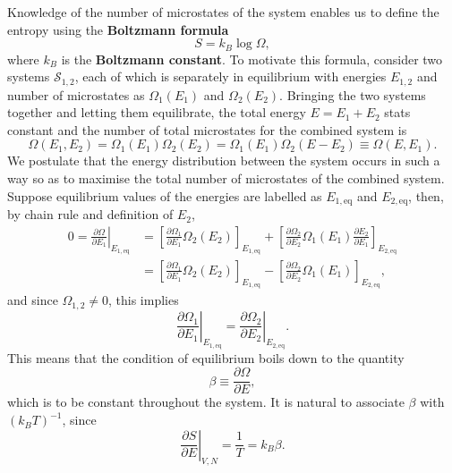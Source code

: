 \documentclass[letter-paper]{tufte-book}
\newcommand\Def[1]{\textbf{#1}}
\begin{document}
Knowledge of the number of microstates of the system enables us to define the
entropy using the \Def{Boltzmann formula}
\begin{equation}
  S = k_B \log \Omega,
\end{equation}
where $k_B$ is the \Def{Boltzmann constant}.
To motivate this formula, consider two systems $\mathcal{S}_{1,2}$, each of
which is separately in equilibrium with energies $E_{1,2}$ and number of
microstates as $\Omega_1(E_1)$ and $\Omega_2(E_2)$. Bringing the two systems
together and letting them equilibrate, the total energy $E = E_1 + E_2$ stats
constant and the number of total microstates for the combined system is
\begin{equation*}
  \Omega(E_1, E_2) = \Omega_1 (E_1) \Omega_2 (E_2) = \Omega_1 (E_1) \Omega_2 (E - E_2) \equiv \Omega(E, E_1).
\end{equation*}
We postulate that the energy distribution between the system occurs in such a
way so as to maximise the total number of microstates of the combined system.
Suppose equilibrium values of the energies are labelled as $E_{1, \mathrm{eq}}$
and $E_{2, \mathrm{eq}}$, then, by chain rule and definition of $E_2$,
\begin{align*}
  0 = \left.\frac{\partial \Omega}{\partial E_1}\right|_{E_{1, \mathrm{eq}}} &= \left[\frac{\partial \Omega_1}{\partial E_1} \Omega_2 (E_2)\right]_{E_{1, \mathrm{eq}}} + \left[\frac{\partial \Omega_2}{\partial E_2} \Omega_1 (E_1) \frac{\partial E_2}{\partial E_1}\right]_{E_{2, \mathrm{eq}}} \\
    & = \left[\frac{\partial \Omega_1}{\partial E_1} \Omega_2 (E_2)\right]_{E_{1, \mathrm{eq}}} - \left[\frac{\partial \Omega_2}{\partial E_2} \Omega_1 (E_1)\right]_{E_{2, \mathrm{eq}}},
\end{align*}
and since $\Omega_{1,2} \neq 0$, this implies
\begin{equation*}
  \left.\frac{\partial \Omega_1}{\partial E_1}\right|_{E_{1, \mathrm{eq}}} = \left.\frac{\partial \Omega_2}{\partial E_2}\right|_{E_{2, \mathrm{eq}}}.
\end{equation*}
This means that the condition of equilibrium boils down to the quantity
\begin{equation}
  \beta \equiv \frac{\partial \Omega}{\partial E},
\end{equation}
which is to be constant throughout the system. It is natural to associate
$\beta$ with $(k_B T)^{-1}$, since
\begin{equation*}
  \left.\frac{\partial S}{\partial E}\right|_{V,N} = \frac{1}{T} = k_B \beta.
\end{equation*}
\end{document}
